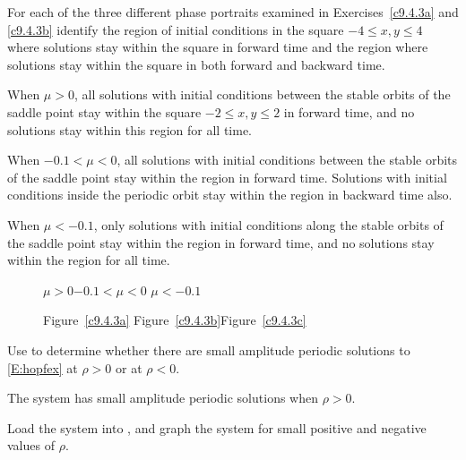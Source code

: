 \documentclass{ximera}
\begin{document}
\begin{exercise} \label{c9.4.3c}
For each of the three different phase portraits examined in 
Exercises~\ref{c9.4.3a} and \ref{c9.4.3b} identify the region of initial 
conditions in the square $-4\leq x,y \leq 4$ where solutions stay within the 
square in forward time and the region where solutions stay within the square 
in both forward and backward time.

\begin{solution}

When $\mu > 0$, all solutions with initial conditions between the
stable orbits of the saddle point stay within the square $-2 \leq
x,y \leq 2$ in forward time, and no solutions stay within this region
for all time.

\para When $-0.1 < \mu < 0$, all solutions with initial
conditions between the stable orbits of the saddle point stay within the
region in forward time.  Solutions with initial conditions inside the
periodic orbit stay within the region in backward time also.

\para When $\mu < -0.1$, only solutions with initial conditions along the
stable orbits of the saddle point stay within the region in forward time,
and no solutions stay within the region for all time.

\begin{figure}[htb]
                       \centerline{%
                       }
		\centerline{$\mu > 0$\hspace{1.2in}$-0.1 < \mu < 0$
\hspace{1.2in}$\mu < -0.1$}
		\centerline{Figure~\ref{c9.4.3a}\hspace{1.2in}
Figure~\ref{c9.4.3b}\hspace{1.2in}Figure~\ref{c9.4.3c}}
\end{figure}

\end{solution}
\end{exercise}

\begin{exercise} \label{c9.4.4}
Use {\pplane} to determine whether there are small amplitude periodic 
solutions to \eqref{E:hopfex} at $\rho>0$ or at $\rho<0$.

\begin{solution}

\ans The system has small amplitude periodic solutions when $\rho > 0$.

\soln Load the system into \Matlab, and graph the
system for small positive and negative values of $\rho$.





\end{solution}
\end{exercise}
\end{document}
